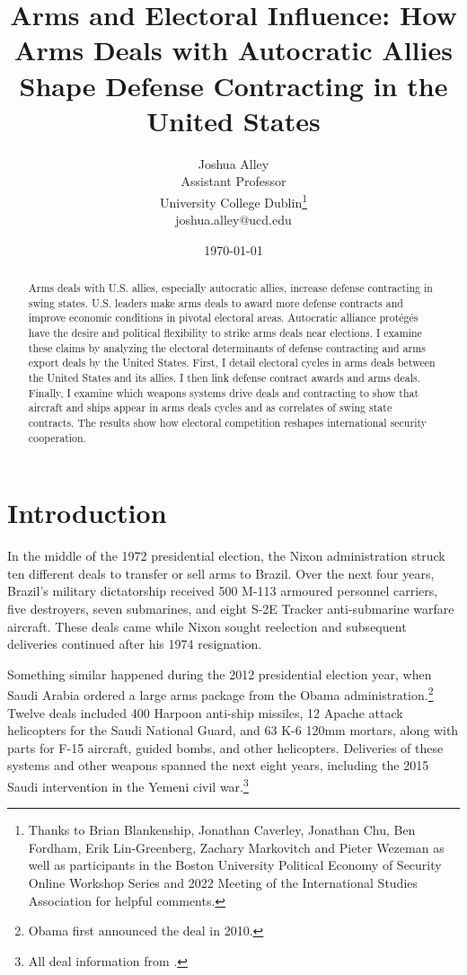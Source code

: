 \documentclass[12pt]{article}
\title{\textbf{Arms and Electoral Influence: How Arms Deals with Autocratic Allies Shape Defense Contracting in the United States}}
\author{Joshua Alley \\
Assistant Professor \\
University College Dublin\thanks{Thanks to Brian Blankenship, Jonathan Caverley, Jonathan Chu, Ben Fordham, Erik Lin-Greenberg, Zachary Markovitch and Pieter Wezeman as well as participants in the Boston University Political Economy of Security Online Workshop Series and 2022 Meeting of the International Studies Association for helpful comments.} \\
joshua.alley@ucd.edu
}
\date{\today}
\begin{document}
\maketitle 

\begin{abstract} 
Arms deals with U.S. allies, especially autocratic allies, increase defense contracting in swing states. 
U.S. leaders make arms deals to award more defense contracts and improve economic conditions in pivotal electoral areas.
Autocratic alliance prot{\'e}g{\'e}s have the desire and political flexibility to strike arms deals near elections. 
I examine these claims by analyzing the electoral determinants of defense contracting and arms export deals by the United States.  
First, I detail electoral cycles in arms deals between the United States and its allies. 
I then link defense contract awards and arms deals.
Finally, I examine which weapons systems drive deals and contracting to show that aircraft and ships appear in arms deals cycles and as correlates of swing state contracts.  
The results show how electoral competition reshapes international security cooperation.
\end{abstract} 


\newpage 
\doublespace 


\section{Introduction}



In the middle of the 1972 presidential election, the Nixon administration struck ten different deals to transfer or sell arms to Brazil.
Over the next four years, Brazil's military dictatorship received 500 M-113 armoured personnel carriers, five destroyers, seven submarines, and eight S-2E Tracker anti-submarine warfare aircraft.
These deals came while Nixon sought reelection and subsequent deliveries continued after his 1974 resignation. 


Something similar happened during the 2012 presidential election year, when Saudi Arabia ordered a large arms package from the Obama administration.\footnote{Obama first announced the deal in 2010.} 
Twelve deals included 400 Harpoon anti-ship missiles, 12 Apache attack helicopters for the Saudi National Guard, and 63 K-6 120mm mortars, along with parts for F-15 aircraft, guided bombs, and other helicopters. 
Deliveries of these systems and other weapons spanned the next eight years, including the 2015 Saudi intervention in the Yemeni civil war.\footnote{All deal information from \citep{Sipri2022}.}
\end{document}

